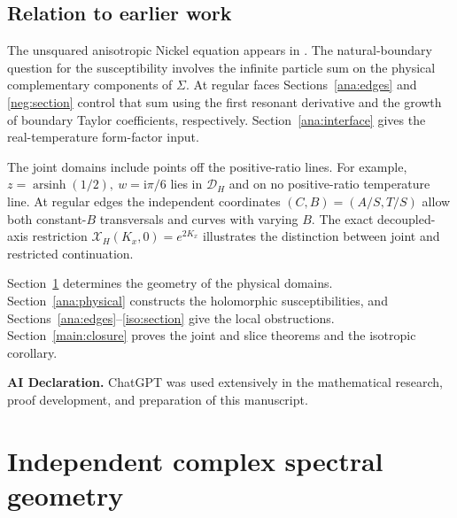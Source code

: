 \documentclass[11pt]{article}
\numberwithin{equation}{section}
\theoremstyle{definition}
\newcommand{\ii}{\mathrm i}
\renewcommand{\DH}{\mathcal D_H}
\newcommand{\XH}{\mathcal X_H}
\begin{document}
\subsection{Relation to earlier work}

The unsquared anisotropic Nickel equation appears in
\cite[Section 6]{BHM}. The natural-boundary question for the
susceptibility involves the infinite particle sum on the physical
complementary components of \(\Sigma\). At regular faces
Sections~\ref{ana:edges} and \ref{neg:section} control that sum using
the first resonant derivative and the growth of boundary Taylor
coefficients, respectively. Section~\ref{ana:interface} gives the
real-temperature form-factor input.

The joint domains include points off the positive-ratio lines. For
example, \(z=\operatorname{arsinh}(1/2),\ w=\ii\pi/6\) lies in
\(\DH\) and on no positive-ratio temperature line. At regular edges
the independent coordinates \((C,B)=(A/S,T/S)\) allow both
constant-\(B\) transversals and curves with varying \(B\).
The exact decoupled-axis restriction \(\XH(K_x,0)=e^{2K_x}\)
illustrates the distinction between joint and restricted
continuation.

Section~\ref{geo:section} determines the geometry of the physical
domains. Section~\ref{ana:physical} constructs the holomorphic
susceptibilities, and Sections~\ref{ana:edges}--\ref{iso:section}
give the local obstructions. Section~\ref{main:closure} proves the
joint and slice theorems and the isotropic corollary.



\par\medskip\noindent\textbf{AI Declaration.} ChatGPT was used extensively in the mathematical research,
proof development, and preparation of this manuscript.\par

\clearpage
\tableofcontents
\clearpage

\section{Independent complex spectral geometry}
\label{geo:section}
\end{document}
